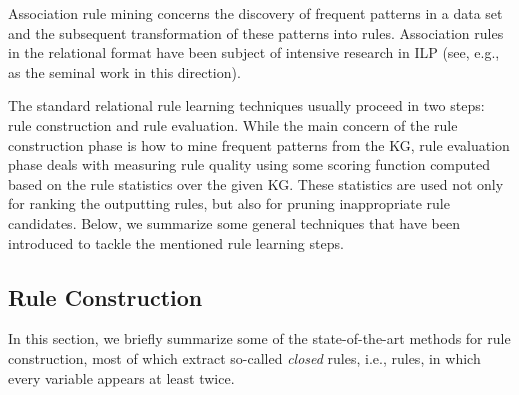 Association rule mining concerns the discovery of frequent patterns in a data set and the subsequent transformation of these patterns into rules. Association rules in the relational format have been subject of intensive research in ILP (see, e.g., \cite{DBLP:conf/ilp/DehaspeR97} as the seminal work in this direction). %

The standard relational rule learning techniques usually proceed in two 
steps: rule construction and rule evaluation. While the main concern of the rule construction phase is how to mine frequent patterns from the KG, 
rule evaluation phase deals with measuring rule quality %
using some scoring function computed based on the rule statistics over the given KG. These statistics are used not only for ranking the outputting rules, but also for pruning inappropriate rule candidates. Below, we summarize some general techniques that have been introduced to tackle the mentioned rule learning steps.

\subsection{Rule Construction}

In this section, we briefly summarize some of the state-of-the-art methods %
for rule construction, most of which %
extract so-called \emph{closed} rules,
i.e., rules, in which every variable appears at least twice. 

\begin{example}
\end{example}

